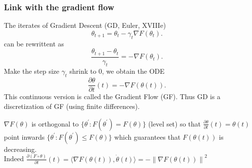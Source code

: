 \subsubsection{Link with the gradient flow}
The iterates of Gradient Descent (GD, Euler, XVIIIe)
\[
    \theta _{t+1} = \theta _t - \gamma _t \nabla F(\theta _t)
.\]
can be rewrittent as 
\[
    \frac{\theta _{t+1} - \theta _t}{\gamma _t} = - \nabla F(\theta _t)
.\]
Make the step size $ \gamma _t $ shrink to $ 0 $, we obtain the ODE 
\[
    \frac{\partial \theta }{\partial t} (t) = - \nabla F(\theta (t))
.\]
This continuous version is called the Gradient Flow (GF). Thus GD is a discretization of GF (using finite differences).

$ \nabla F(\theta ) $ is orthogonal to $ \{\theta ^\prime : F(\theta ^\prime ) = F(\theta )\} $ (level set) so that $ \frac{\partial \theta }{\partial t} (t) = \theta (t) $ point inwards $ \{\theta ^\prime : F(\theta ^\prime ) \leq F(\theta ) \} $ which guarantees that $ F(\theta (t)) $ is decreasing. \\
Indeed $ \frac{\partial (F \circ \theta )}{\partial t}(t) = \langle \nabla F(\theta (t)), \dot{\theta }(t) \rangle = - \left\| \nabla F(\theta (t)) \right\| ^2  $ 

